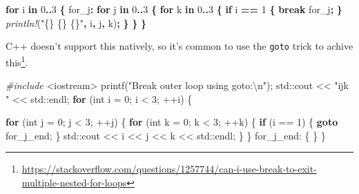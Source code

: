 \documentclass[
]{book}
\newenvironment{Shaded}{\begin{snugshade}}{\end{snugshade}}
\newcommand{\BuiltInTok}[1]{#1}
\newcommand{\ControlFlowTok}[1]{\textcolor[rgb]{0.13,0.29,0.53}{\textbf{#1}}}
\newcommand{\DataTypeTok}[1]{\textcolor[rgb]{0.13,0.29,0.53}{#1}}
\newcommand{\DecValTok}[1]{\textcolor[rgb]{0.00,0.00,0.81}{#1}}
\newcommand{\ImportTok}[1]{#1}
\newcommand{\KeywordTok}[1]{\textcolor[rgb]{0.13,0.29,0.53}{\textbf{#1}}}
\newcommand{\NormalTok}[1]{#1}
\newcommand{\OperatorTok}[1]{\textcolor[rgb]{0.81,0.36,0.00}{\textbf{#1}}}
\newcommand{\OtherTok}[1]{\textcolor[rgb]{0.56,0.35,0.01}{#1}}
\newcommand{\PreprocessorTok}[1]{\textcolor[rgb]{0.56,0.35,0.01}{\textit{#1}}}
\newcommand{\SpecialCharTok}[1]{\textcolor[rgb]{0.00,0.00,0.00}{#1}}
\newcommand{\StringTok}[1]{\textcolor[rgb]{0.31,0.60,0.02}{#1}}
\begin{document}
\begin{Shaded}
\begin{Highlighting}[]
\KeywordTok{for}\NormalTok{ i }\KeywordTok{in} \DecValTok{0}\OperatorTok{..}\DecValTok{3} \OperatorTok{\{}
    \OtherTok{\textquotesingle{}for\_j}\OperatorTok{:} \KeywordTok{for}\NormalTok{ j }\KeywordTok{in} \DecValTok{0}\OperatorTok{..}\DecValTok{3} \OperatorTok{\{}
        \KeywordTok{for}\NormalTok{ k }\KeywordTok{in} \DecValTok{0}\OperatorTok{..}\DecValTok{3} \OperatorTok{\{}
            \KeywordTok{if}\NormalTok{ i }\OperatorTok{==} \DecValTok{1} \OperatorTok{\{}
                \KeywordTok{break} \OtherTok{\textquotesingle{}for\_j}\OperatorTok{;}
            \OperatorTok{\}}
            \PreprocessorTok{println!}\NormalTok{(}\StringTok{"\{\} \{\} \{\}"}\OperatorTok{,}\NormalTok{ i}\OperatorTok{,}\NormalTok{ j}\OperatorTok{,}\NormalTok{ k)}\OperatorTok{;}
        \OperatorTok{\}}
    \OperatorTok{\}}
\OperatorTok{\}}
\end{Highlighting}
\end{Shaded}

C++ doesn't support this natively, so it's common to use the \texttt{goto} trick to achive this\footnote{\url{https://stackoverflow.com/questions/1257744/can-i-use-break-to-exit-multiple-nested-for-loops}}.

\begin{Shaded}
\begin{Highlighting}[]
\PreprocessorTok{\#include }\ImportTok{\textless{}iostream\textgreater{}}
\NormalTok{printf(}\StringTok{"Break outer loop using goto:}\SpecialCharTok{\textbackslash{}n}\StringTok{"}\NormalTok{);}
\BuiltInTok{std::}\NormalTok{cout \textless{}\textless{} }\StringTok{"ijk "}\NormalTok{ \textless{}\textless{} }\BuiltInTok{std::}\NormalTok{endl;}
\ControlFlowTok{for}\NormalTok{ (}\DataTypeTok{int}\NormalTok{ i = }\DecValTok{0}\NormalTok{; i \textless{} }\DecValTok{3}\NormalTok{; ++i)}
\NormalTok{\{}

    \ControlFlowTok{for}\NormalTok{ (}\DataTypeTok{int}\NormalTok{ j = }\DecValTok{0}\NormalTok{; j \textless{} }\DecValTok{3}\NormalTok{; ++j)}
\NormalTok{    \{}
        \ControlFlowTok{for}\NormalTok{ (}\DataTypeTok{int}\NormalTok{ k = }\DecValTok{0}\NormalTok{; k \textless{} }\DecValTok{3}\NormalTok{; ++k)}
\NormalTok{        \{}
            \ControlFlowTok{if}\NormalTok{ (i == }\DecValTok{1}\NormalTok{)}
\NormalTok{            \{}
                \ControlFlowTok{goto}\NormalTok{ for\_j\_end;}
\NormalTok{            \}}
            \BuiltInTok{std::}\NormalTok{cout \textless{}\textless{} i \textless{}\textless{} j \textless{}\textless{} k \textless{}\textless{} }\BuiltInTok{std::}\NormalTok{endl;}
\NormalTok{        \}}
\NormalTok{    \}}
\NormalTok{    for\_j\_end:}
\NormalTok{    \{}
\NormalTok{    \}}
\NormalTok{\}}
\end{Highlighting}
\end{Shaded}
\end{document}
